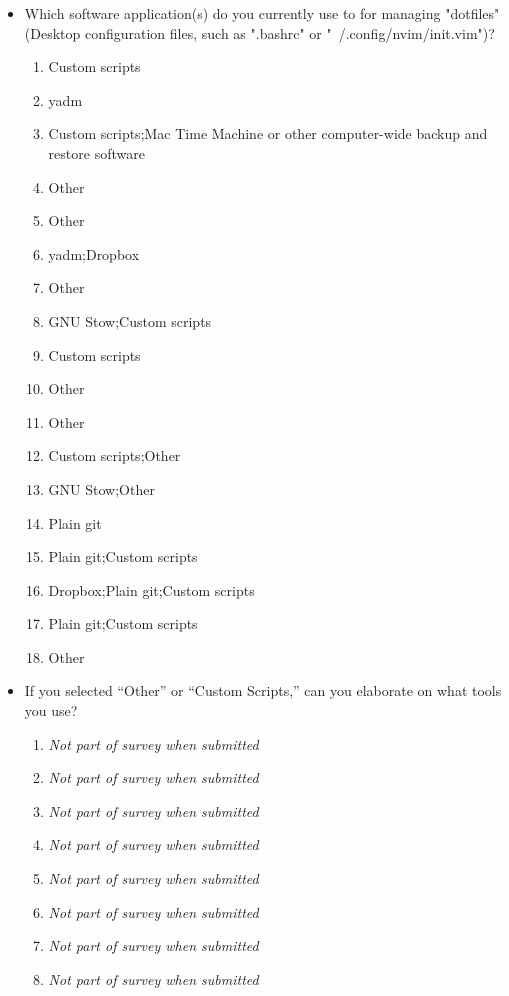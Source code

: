 \documentclass[letterpaper]{jdf}
\begin{document}
\begin{itemize}
    \item Which software application(s) do you currently use to for managing "dotfiles" (Desktop configuration files, such as ".bashrc" or "~/.config/nvim/init.vim")?
    \begin{enumerate}
        \item Custom scripts
        \item yadm
        \item Custom scripts;Mac Time Machine or other computer-wide backup and restore software
        \item Other
        \item Other
        \item yadm;Dropbox
        \item Other
        \item GNU Stow;Custom scripts
        \item Custom scripts
        \item Other
        \item Other
        \item Custom scripts;Other
        \item GNU Stow;Other
        \item Plain git
        \item Plain git;Custom scripts
        \item Dropbox;Plain git;Custom scripts
        \item Plain git;Custom scripts
        \item Other
    \end{enumerate}
    \item If you selected “Other” or “Custom Scripts,” can you elaborate on what tools you use?
    \begin{enumerate}
        \item \emph{Not part of survey when submitted}
        \item \emph{Not part of survey when submitted}
        \item \emph{Not part of survey when submitted}
        \item \emph{Not part of survey when submitted}
        \item \emph{Not part of survey when submitted}
        \item \emph{Not part of survey when submitted}
        \item \emph{Not part of survey when submitted}
        \item \emph{Not part of survey when submitted}

\end{enumerate}
\end{itemize}
\end{document}
